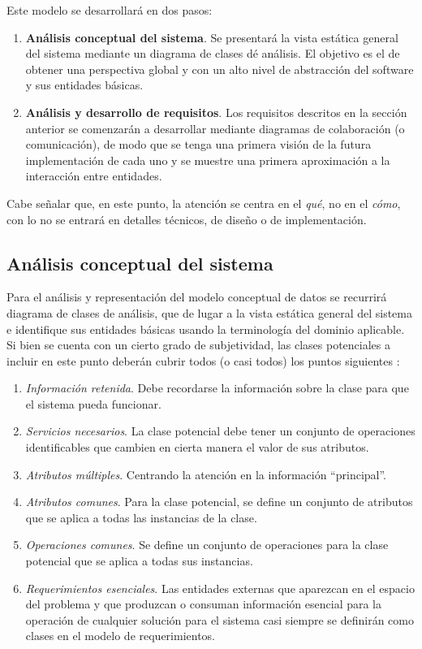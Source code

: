 Este modelo se desarrollará en dos pasos: 

\begin{enumerate}  
	\item \textbf{Análisis conceptual del sistema}. Se presentará la vista estática general del sistema mediante un diagrama de clases dé análisis. El objetivo es el de obtener una perspectiva global y con un alto nivel de abstracción del software y sus entidades básicas.
	\item \textbf{Análisis y desarrollo de requisitos}. Los requisitos descritos en la sección anterior se comenzarán a desarrollar mediante diagramas de colaboración (o comunicación), de modo que se tenga una primera visión de la futura implementación de cada uno y se muestre una primera aproximación a la interacción entre entidades.
\end{enumerate}

Cabe señalar que, en este punto, la atención se centra en el \emph{qué}, no en el \emph{cómo}, con lo no se entrará en detalles técnicos, de diseño o de implementación.

\subsection{Análisis conceptual del sistema}

Para el análisis y representación del modelo conceptual de datos se recurrirá diagrama de clases de análisis, que de lugar a la vista estática general del sistema e identifique sus entidades básicas usando la terminología del dominio aplicable. Si bien se cuenta con un cierto grado de subjetividad, las clases potenciales a incluir en este punto deberán cubrir todos (o casi todos) los puntos siguientes \cite{Coa91}:

\begin{enumerate}  
	\item \textit{Información retenida}. Debe recordarse la información sobre la clase para que el sistema pueda funcionar.
	\item \textit{Servicios necesarios}. La clase potencial debe tener un conjunto de operaciones identificables que cambien en cierta manera el valor de sus atributos.
	\item \textit{Atributos múltiples}. Centrando la atención en la información ``principal''.
	\item \textit{Atributos comunes}. Para la clase potencial, se define un conjunto de atributos que se aplica a todas las instancias de la clase.
	\item \textit{Operaciones comunes}. Se define un conjunto de operaciones para la clase potencial que se aplica a todas sus instancias.
	\item \textit{Requerimientos esenciales}. Las entidades externas que aparezcan en el espacio del problema y que produzcan o consuman información esencial para la operación de cualquier solución para el sistema casi siempre se definirán como clases en el modelo de requerimientos.	
\end{enumerate}

